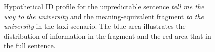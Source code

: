 \begin{figure}
\begin{minipage}{\textwidth}
\end{minipage}
\caption{Hypothetical ID profile for the unpredictable sentence \textit{tell me the way to the university} and the meaning-equivalent fragment \textit{to the university} in the taxi scenario. The blue area illustrates the distribution of information in the fragment and the red area that in the full sentence.\label{fig:fragments-uid-unpredictable}}
\end{figure}

